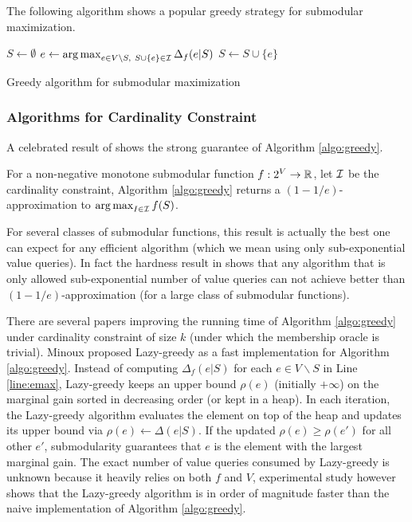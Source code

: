 The following algorithm shows a popular greedy strategy for submodular maximization.

\begin{algorithm}[H]
\DontPrintSemicolon %
$S \gets \emptyset$\;
 {
  $e \gets \operatorname*{arg\,max}_{e\in V\backslash S, ~S\cup\{e\}\in \mathcal{I}} \Delta_f(e|S)$\;\label{line:emax}
  $S \gets S\cup \{e\}$\;
}
\;
\caption{{\sc Greedy} algorithm for submodular maximization}
\label{algo:greedy}
\end{algorithm}


\subsubsection{Algorithms for Cardinality Constraint}


A celebrated result of \cite{NWF78} shows the strong guarantee of Algorithm \ref{algo:greedy}.
\begin{theorem}
  \label{thm:1978}
  For a non-negative monotone submodular function $f: 2^V \rightarrow \mathbb{R}$, let $\mathcal{I}$ be the cardinality constraint, Algorithm \ref{algo:greedy} returns a $(1 - 1/e)$-approximation to $\operatorname*{arg\,max}_{I\in \mathcal{I}} f(S)$.
\end{theorem}
For several classes of submodular functions, this result is actually the best one can expect for any efficient algorithm (which we mean using only sub-exponential value queries). In fact the hardness result in \cite{NWF78,F98} shows that any algorithm that is only allowed sub-exponential number of value queries can not achieve better than $(1 - 1/e)$-approximation (for a large class of submodular functions).

There are several papers improving the running time of Algorithm \ref{algo:greedy} under cardinality constraint of size $k$ (under which the membership oracle is trivial). Minoux \cite{M78} proposed {\sc Lazy-greedy} as a fast implementation for Algorithm \ref{algo:greedy}. Instead of computing $\Delta_f(e|S)$ for each $e\in V\backslash S$ in Line \ref{line:emax},  {\sc Lazy-greedy} keeps an upper bound $\rho(e)$ (initially $+\infty$) on the marginal gain sorted in decreasing order (or kept in a heap). In each iteration, the {\sc Lazy-greedy} algorithm evaluates the element on top of the heap and updates its upper bound via $\rho(e) \gets \Delta(e|S)$. If the updated $\rho(e) \geq \rho(e')$ for all other $e'$, submodularity guarantees that $e$ is the element with the largest marginal gain. The exact number of value queries consumed by {\sc Lazy-greedy} is unknown because it heavily relies on both $f$ and $V$, experimental study however shows that the {\sc Lazy-greedy} algorithm is in order of magnitude faster than the naive implementation of Algorithm \ref{algo:greedy}.  

